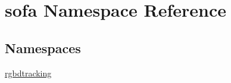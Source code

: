 \hypertarget{namespacesofa}{}\section{sofa Namespace Reference}
\label{namespacesofa}
\subsection*{Namespaces}
\begin{DoxyCompactItemize}
\item 
 \hyperlink{namespacesofa_1_1rgbdtracking}{rgbdtracking}
\end{DoxyCompactItemize}

